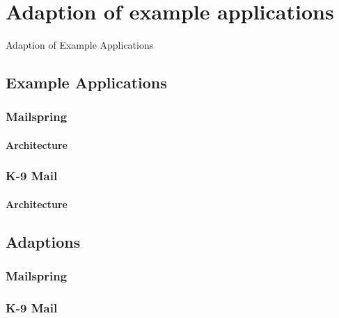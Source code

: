 \chapter{Adaption of example applications}
\label{ch:adaption}


Adaption of Example Applications

\section{Example Applications}
\subsection{Mailspring}
\subsubsection{Architecture}
\subsection{K-9 Mail}
\subsubsection{Architecture}

\section{Adaptions}
\subsection{Mailspring}
\subsection{K-9 Mail}
